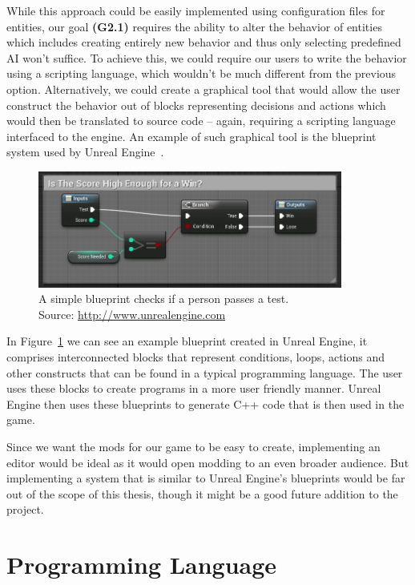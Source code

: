 While this approach could be easily implemented using configuration files for entities, our goal \textbf{(G2.1)} requires the ability
to alter the behavior of entities which includes creating entirely new behavior and thus only selecting predefined AI won't suffice.
To achieve this, we could require our users to write the behavior using a scripting language, which wouldn't be much different
from the previous option. Alternatively, we could create a graphical tool that would allow the user construct the behavior out of blocks
representing decisions and actions which would then be translated to source code -- again, requiring a scripting language interfaced
to the engine. An example of such graphical tool is the blueprint system used by Unreal Engine~\cite{UE}.

\begin{figure}[h]
    \centering
    \includegraphics[width=10cm]{../img/blueprints.jpg}
    \caption{A simple blueprint checks if a person passes a test.
             \\Source: \href{://docs.unrealengine.com/latest/images/Engine/Blueprints/UserGuide/Macros/score\_comparison\_example\_macro.jpg}
             {http://www.unrealengine.com}}
    \label{ue-blueprints}
\end{figure}

In Figure~\ref{ue-blueprints} we can see an example blueprint created in Unreal Engine, it comprises interconnected blocks that represent
conditions, loops, actions and other constructs that can be found in a typical programming language. The user uses these blocks to
create programs in a more user friendly manner. Unreal Engine then uses these blueprints to generate C++ code that is then used in the game.

Since we want the mods for our game to be easy to create, implementing an editor would be ideal as it would open modding to an even
broader audience. But implementing a system that is similar to Unreal Engine's blueprints would be far out of the scope of this thesis,
though it might be a good future addition to the project.

\section{Programming Language}


